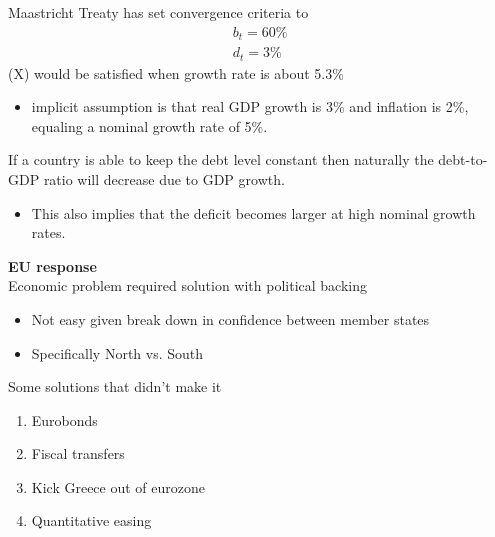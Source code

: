 \documentclass{beamer}
\begin{document}
\begin{frame}
  Maastricht Treaty has set convergence criteria to
  \begin{align}
    b_t=60\%\\
    d_t=3\%
  \end{align}
   (X) would be satisfied when growth rate is about 5.3\%
   \begin{itemize}
     \item implicit assumption is that real GDP growth is 3\% and inflation is 2\%, equaling a nominal growth rate of 5\%.  
   \end{itemize} 
   If a country is able to keep the debt level constant then naturally the debt-to-GDP ratio will decrease due to GDP growth. 
   \begin{itemize}
     \item This also implies that the deficit becomes larger at high nominal growth rates.  
   \end{itemize}
\end{frame}


\begin{frame}
  \textbf{EU response}\\
  Economic problem required solution with political backing
  \begin{itemize}
    \item Not easy given break down in confidence between member states
    \item Specifically North vs. South
  \end{itemize}
  \medskip
  Some solutions that didn't make it
  \begin{enumerate}
    \item Eurobonds
    \item Fiscal transfers
    \item Kick Greece out of eurozone
    \item Quantitative easing
  \end{enumerate}
 \end{frame}
\end{document}
